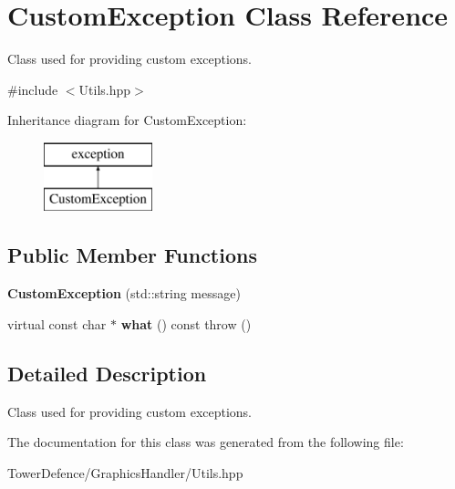\hypertarget{class_custom_exception}{}\section{Custom\+Exception Class Reference}
\label{class_custom_exception}


Class used for providing custom exceptions.  




{\ttfamily \#include $<$Utils.\+hpp$>$}

Inheritance diagram for Custom\+Exception\+:\begin{figure}[H]
\begin{center}
\leavevmode
\includegraphics[height=2.000000cm]{class_custom_exception}
\end{center}
\end{figure}
\subsection*{Public Member Functions}
\begin{DoxyCompactItemize}
\item 
\mbox{\label{class_custom_exception_a2e4226b49820b0cc7408ad5fa62b061a}} 
{\bfseries Custom\+Exception} (std\+::string message)
\item 
\mbox{\label{class_custom_exception_a2b382e4dd37ef2af58162fdf2087318d}} 
virtual const char $\ast$ {\bfseries what} () const  throw ()
\end{DoxyCompactItemize}


\subsection{Detailed Description}
Class used for providing custom exceptions. 

The documentation for this class was generated from the following file\+:\begin{DoxyCompactItemize}
\item 
Tower\+Defence/\+Graphics\+Handler/Utils.\+hpp\end{DoxyCompactItemize}
